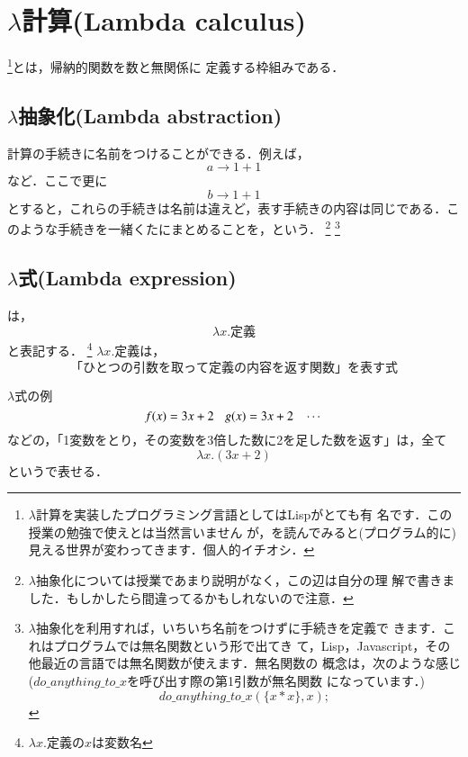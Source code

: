 \chapter{$\lambda$計算(Lambda calculus)}
\footnote{$\lambda$計算を実装したプログラミング言語としてはLispがとても有
名です．この授業の勉強で使えとは当然言いません
が，\cite{Gerald_Julie_Harold_和田200002}を読んでみると(プログラム的に)
見える世界が変わってきます．個人的イチオシ．}とは，帰納的関数を数と無関係に
定義する枠組みである．

\section{$\lambda$抽象化(Lambda abstraction)}
計算の手続きに名前をつけることができる．例えば，
\[
 a \rightarrow 1+1
\]
など．ここで更に
\[
 b \rightarrow 1+1
\]
とすると，これらの手続きは名前は違えど，表す手続きの内容は同じである．こ
のような手続きを一緒くたにまとめることを，という．
\footnote{$\lambda$抽象化については授業であまり説明がなく，この辺は自分の理
解で書きました．もしかしたら間違ってるかもしれないので注意．}
\footnote{$\lambda$抽象化を利用すれば，いちいち名前をつけずに手続きを定義で
きます．これはプログラムでは無名関数という形で出てき
て，Lisp，Javascript，その他最近の言語では無名関数が使えます．無名関数の
概念は，次のような感じ($do\_anything\_to\_x$を呼び出す際の第1引数が無名関数
になっています．)
\begin{equation} \label{eq:08koukai}
 do\_anything\_to\_x (\{ x * x \}, x); 
\end{equation}
}

\section{$\lambda$式(Lambda expression)}
は，
\[
\lambda x. 定義
\]
と表記する．
 \footnote{$\lambda x. 定義$の$x$は変数名}
$\lambda x.定義$は，
\[
 「ひとつの引数を取って定義の内容を返す関数」を表す式
\]

\begin{myexample}{$\lambda$式の例}
\[
 f(x) = 3x + 2 \hspace{2ex} g(x) = 3x + 2\hspace{2ex}\cdots 
\]
 などの，「1変数をとり，その変数を3倍した数に2を足した数を返す」は，全て
 \[
  \lambda x. (3x+2)
 \]
 というで表せる．
\end{myexample}

